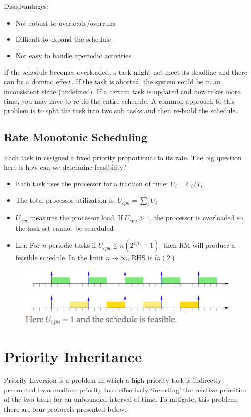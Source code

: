 \documentclass{hw}
\begin{document}
Disadvantages:
\begin{itemize}
  \item Not robust to overloads/overruns
  \item Difficult to expand the schedule
  \item Not easy to handle aperiodic activities
\end{itemize}
If the schedule becomes overloaded, a task might not meet its deadline and there
can be a domino effect. If the task is aborted, the system could be in an 
inconsistent state (undefined). If a certain task is updated and now takes more
time, you may have to re-do the entire schedule. A common approach to this 
problem is to split the task into two sub tasks and then re-build the schedule.

\subsection{Rate Monotonic Scheduling}
Each task in assigned a fixed priority proportional to its rate. The big question
here is how can we determine feasibility?
\begin{itemize}
  \item Each task uses the processor for a fraction of time: $U_{i} = C_{i}/T_{i}$
  \item The total processor utilization is: $U_{cpu} = \sum\limits_{i} U_{i}$
  \item $U_{cpu}$ measures the processor load. If $U_{cpu} > 1$, the processor
    is overloaded so the task set cannot be scheduled. 
  \item Liu: For $n$ periodic tasks if $U_{cpu} \leq n(2^{1/n}-1)$, then RM will
    produce a feasible schedule. In the limit $n \rightarrow \infty$, RHS is 
    $ln(2)$
\end{itemize}
\begin{figure}[H]
  \centering
  \includegraphics[scale=.6]{img/rm}
\end{figure}

\section{Priority Inheritance}
Priority Inversion is a problem in which a high priority task is indirectly 
preempted by a medium priority task effectively `inverting' the relative 
priorities of the two tasks for an unbounded interval of time. To mitigate, 
this problem, there are four protocols presented below.
\end{document}
